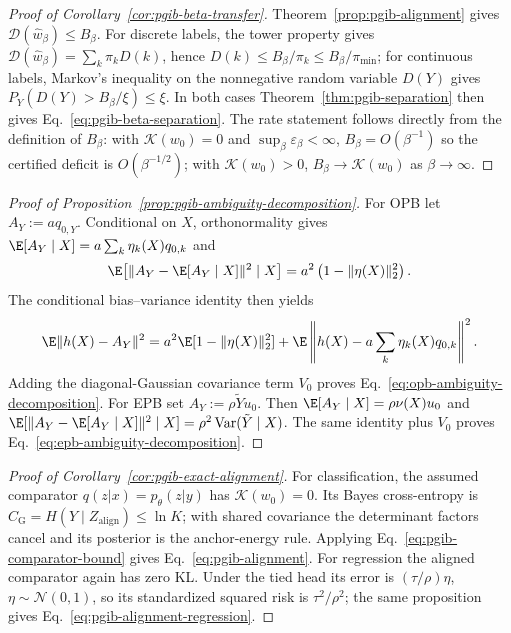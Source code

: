 \begin{proof}[Proof of Corollary~\ref{cor:pgib-beta-transfer}]
Theorem~\ref{prop:pgib-alignment} gives
$\mathcal D(\widehat w_\beta)\le B_\beta$. For discrete labels, the tower property
gives $\mathcal D(\widehat w_\beta)=\sum_k\pi_kD(k)$, hence
$D(k)\le B_\beta/\pi_k\le B_\beta/\pi_{\min}$; for continuous labels, Markov's
inequality on the nonnegative random variable $D(Y)$ gives
$P_Y(D(Y)>B_\beta/\xi)\le\xi$. In both cases
Theorem~\ref{thm:pgib-separation} then gives
Eq.~\eqref{eq:pgib-beta-separation}. The rate statement follows
directly from the definition of $B_\beta$: with $\mathcal K(w_0)=0$ and
$\sup_\beta\varepsilon_\beta<\infty$, $B_\beta=O(\beta^{-1})$ so the certified
deficit is $O(\beta^{-1/2})$; with $\mathcal K(w_0)>0$,
$B_\beta\to\mathcal K(w_0)$ as $\beta\to\infty$.
\end{proof}

\begin{proof}[Proof of Proposition~\ref{prop:pgib-ambiguity-decomposition}]
For OPB let $A_Y:=a q_{0,Y}$. Conditional on $X$, orthonormality gives
$\E[A_Y\mid X]=a\sum_k\eta_k(X)q_{0,k}$ and
\begin{equation*}
\E\!\left[\|A_Y-\E[A_Y\mid X]\|^2\mid X\right]
=a^2\left(1-\|\eta(X)\|_2^2\right).
\end{equation*}
The conditional bias--variance identity then yields
\begin{equation*}
\E\|h(X)-A_Y\|^2
=a^2\E[1-\|\eta(X)\|_2^2]
+\E\left\|h(X)-a\sum_k\eta_k(X)q_{0,k}\right\|^2.
\end{equation*}
Adding the diagonal-Gaussian covariance term $V_0$ proves
Eq.~\eqref{eq:opb-ambiguity-decomposition}. For EPB set
$A_Y:=\rho\tilde Y u_0$. Then
$\E[A_Y\mid X]=\rho\nu(X)u_0$ and
$\E[\|A_Y-\E[A_Y\mid X]\|^2\mid X]
=\rho^2\operatorname{Var}(\tilde Y\mid X)$. The same identity plus $V_0$ proves
Eq.~\eqref{eq:epb-ambiguity-decomposition}.
\end{proof}

\begin{proof}[Proof of Corollary~\ref{cor:pgib-exact-alignment}]
For classification, the assumed comparator $q(z|x)=p_\theta(z|y)$ has
$\mathcal K(w_0)=0$. Its Bayes cross-entropy is
$C_{\mathrm G}=H(Y\mid Z_{\mathrm{align}})\le\ln K$; with shared covariance the
determinant factors cancel and its posterior is the anchor-energy rule. Applying
Eq.~\eqref{eq:pgib-comparator-bound} gives Eq.~\eqref{eq:pgib-alignment}. For
regression the aligned comparator again has zero KL. Under the tied head its error is
$(\tau/\rho)\eta$, $\eta\sim\mathcal N(0,1)$, so its standardized squared risk is
$\tau^2/\rho^2$; the same proposition gives
Eq.~\eqref{eq:pgib-alignment-regression}.
\end{proof}

